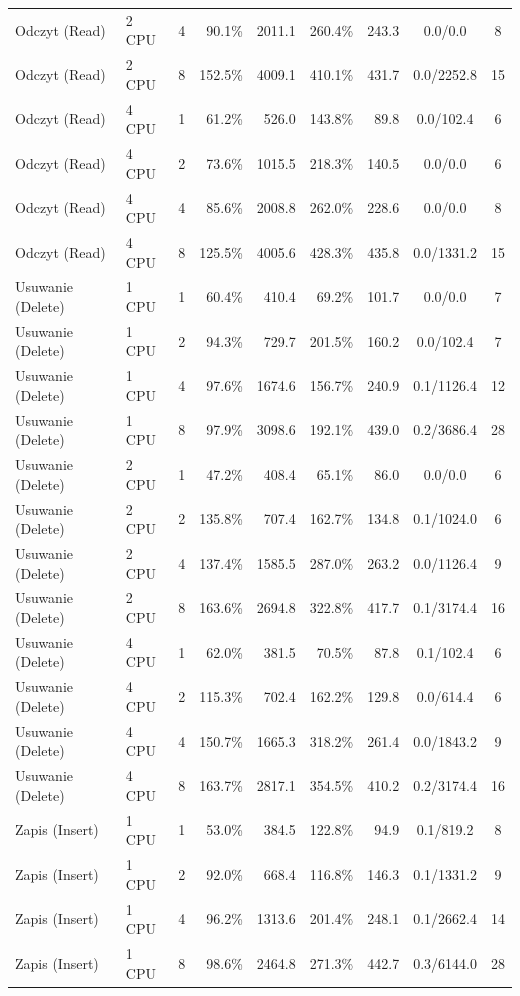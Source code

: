 \begin{table}[ht]
{\begin{tabular}{llcrrrrcc}
Odczyt (Read) & 2 CPU & 4 & 90.1\% & 2011.1 & 260.4\% & 243.3 & 0.0/0.0 & 8 \\
Odczyt (Read) & 2 CPU & 8 & 152.5\% & 4009.1 & 410.1\% & 431.7 & 0.0/2252.8 & 15 \\
Odczyt (Read) & 4 CPU & 1 & 61.2\% & 526.0 & 143.8\% & 89.8 & 0.0/102.4 & 6 \\
Odczyt (Read) & 4 CPU & 2 & 73.6\% & 1015.5 & 218.3\% & 140.5 & 0.0/0.0 & 6 \\
Odczyt (Read) & 4 CPU & 4 & 85.6\% & 2008.8 & 262.0\% & 228.6 & 0.0/0.0 & 8 \\
Odczyt (Read) & 4 CPU & 8 & 125.5\% & 4005.6 & 428.3\% & 435.8 & 0.0/1331.2 & 15 \\
Usuwanie (Delete) & 1 CPU & 1 & 60.4\% & 410.4 & 69.2\% & 101.7 & 0.0/0.0 & 7 \\
Usuwanie (Delete) & 1 CPU & 2 & 94.3\% & 729.7 & 201.5\% & 160.2 & 0.0/102.4 & 7 \\
Usuwanie (Delete) & 1 CPU & 4 & 97.6\% & 1674.6 & 156.7\% & 240.9 & 0.1/1126.4 & 12 \\
Usuwanie (Delete) & 1 CPU & 8 & 97.9\% & 3098.6 & 192.1\% & 439.0 & 0.2/3686.4 & 28 \\
Usuwanie (Delete) & 2 CPU & 1 & 47.2\% & 408.4 & 65.1\% & 86.0 & 0.0/0.0 & 6 \\
Usuwanie (Delete) & 2 CPU & 2 & 135.8\% & 707.4 & 162.7\% & 134.8 & 0.1/1024.0 & 6 \\
Usuwanie (Delete) & 2 CPU & 4 & 137.4\% & 1585.5 & 287.0\% & 263.2 & 0.0/1126.4 & 9 \\
Usuwanie (Delete) & 2 CPU & 8 & 163.6\% & 2694.8 & 322.8\% & 417.7 & 0.1/3174.4 & 16 \\
Usuwanie (Delete) & 4 CPU & 1 & 62.0\% & 381.5 & 70.5\% & 87.8 & 0.1/102.4 & 6 \\
Usuwanie (Delete) & 4 CPU & 2 & 115.3\% & 702.4 & 162.2\% & 129.8 & 0.0/614.4 & 6 \\
Usuwanie (Delete) & 4 CPU & 4 & 150.7\% & 1665.3 & 318.2\% & 261.4 & 0.0/1843.2 & 9 \\
Usuwanie (Delete) & 4 CPU & 8 & 163.7\% & 2817.1 & 354.5\% & 410.2 & 0.2/3174.4 & 16 \\
Zapis (Insert) & 1 CPU & 1 & 53.0\% & 384.5 & 122.8\% & 94.9 & 0.1/819.2 & 8 \\
Zapis (Insert) & 1 CPU & 2 & 92.0\% & 668.4 & 116.8\% & 146.3 & 0.1/1331.2 & 9 \\
Zapis (Insert) & 1 CPU & 4 & 96.2\% & 1313.6 & 201.4\% & 248.1 & 0.1/2662.4 & 14 \\
Zapis (Insert) & 1 CPU & 8 & 98.6\% & 2464.8 & 271.3\% & 442.7 & 0.3/6144.0 & 28 \\

\end{tabular}}
\end{table}
